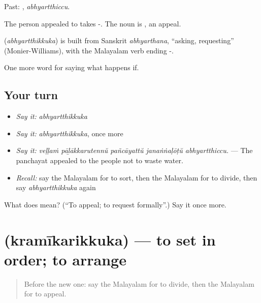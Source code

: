 Past: , \emph{abhyartthiccu}.

The person appealed to takes -. The noun is , an appeal.

\begin{cousinweb}
\textbf{} (\emph{abhyartthikkuka}) is built from Sanskrit \emph{abhyarthana}, \textquotedblleft{}asking, requesting\textquotedblright{} (Monier-Williams), with the Malayalam verb ending -.
\end{cousinweb}

\begin{grammarlens}[title={What you've built}]
One more word for saying what happens if.
\end{grammarlens}

\subsection*{Your turn}
\begin{itemize}
\raggedright
  \item \emph{Say it:} \emph{abhyartthikkuka}
  \item \emph{Say it:} \emph{abhyartthikkuka}, once more
  \item \emph{Say it:} \emph{veḷḷaṁ pāḻākkarutennŭ pañcāyattŭ janaṅṅaḷōṭŭ abhyartthiccu.} — The panchayat appealed to the people not to waste water.
  \item \emph{Recall:} say the Malayalam for to sort, then the Malayalam for to divide, then say \emph{abhyartthikkuka} again
\end{itemize}

\begin{tcolorbox}[breakable,colback=teal!4,colframe=teal!35!black,title={Before you move on}]
What does  mean? (\textquotedblleft{}To appeal; to request formally\textquotedblright{}.) Say it once more.
\end{tcolorbox}
\section[\texorpdfstring{\ml{ക്രമീകരിക്കുക} (kramīkarikkuka)}{ക്രമീകരിക്കുക (kramīkarikkuka)}]{ (kramīkarikkuka) — to set in order; to arrange}

\label{lesson:ML-C457-kramikarikkuka}



\begin{quote}
Before the new one: say the Malayalam for to divide, then the Malayalam for to appeal.
\end{quote}

